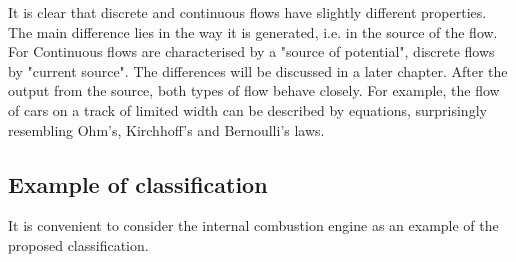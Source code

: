 \documentclass[a4paper,11pt]{article}
\begin{document}
It is clear that discrete and continuous flows have slightly different
properties.  The main difference lies in the way it is generated, i.e. in the
source of the flow. For Continuous flows are characterised by a "source of
potential", discrete flows by "current source". The differences will be
discussed in a later chapter. After the output from the source, both types of
flow behave closely. For example, the flow of cars on a track of limited width
can be described by equations, surprisingly resembling Ohm's, Kirchhoff's and
Bernoulli's laws.

\subsection{Example of classification}

It is convenient to consider the internal combustion engine as an example of
the proposed classification.
\end{document}
